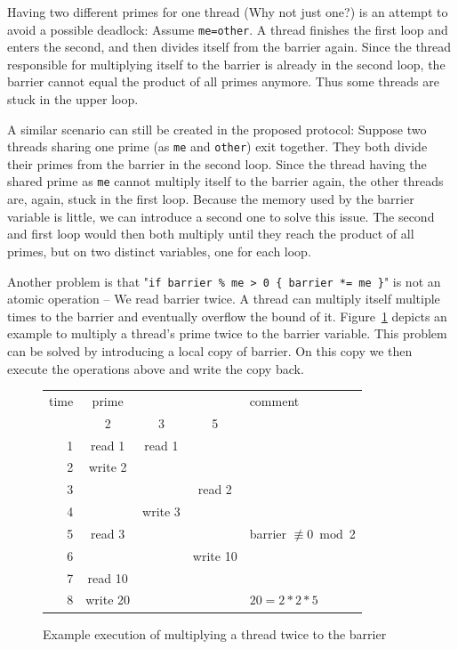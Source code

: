 \documentclass[a4paper, 10pt]{article}
\begin{document}
Having two different primes for one thread (Why not just one?) is an attempt to avoid a possible deadlock: Assume \texttt{me=other}. A thread finishes the first loop and enters the second, and then divides itself from the barrier again. Since the thread responsible for multiplying itself to the barrier is already in the second loop, the barrier cannot equal the product of all primes anymore. Thus some threads are stuck in the upper loop.

A similar scenario can still be created in the proposed protocol: Suppose two threads sharing one prime (as \texttt{me} and \texttt{other}) exit together. They both divide their primes from the barrier in the second loop. Since the thread having the shared prime as \texttt{me} cannot multiply itself to the barrier again, the other threads are, again, stuck in the first loop. Because the memory used by the barrier variable is little, we can introduce a second one to solve this issue. The second and first loop would then both multiply until they reach the product of all primes, but on two distinct variables, one for each loop.

Another problem is that "\texttt{if~barrier~\%~me~>~0~\{~barrier~*=~me~\}}" is not an atomic operation -- We read barrier twice. A thread can multiply itself multiple times to the barrier and eventually overflow the bound of it. Figure~\ref{fig:deadlock1} depicts an example to multiply a thread's prime twice to the barrier variable. This problem can be solved by introducing a local copy of barrier. On this copy we then execute the operations above and write the copy back.
\begin{figure}[htbp]
	\centering
	\begin{tabular}{r | c c c | l}
		time & prime    &         &          & comment \\
			 & 2        & 3       & 5        &         \\
		\hline
		1    & read 1   & read 1  &          &         \\
		2    & write 2  &         &          &         \\
		3    &          &         & read 2   &         \\
		4    &          & write 3 &          &         \\
		5    & read 3   &         &          & barrier $\not\equiv 0 \bmod{}$2 \\
		6    &          &         & write 10 &         \\
		7    & read 10  &         &          &         \\
		8    & write 20 &         &          & $20 = 2 * 2 * 5$ \\
	\end{tabular}
	\caption{Example execution of multiplying a thread twice to the barrier}
	\label{fig:deadlock1}
\end{figure}
\end{document}
